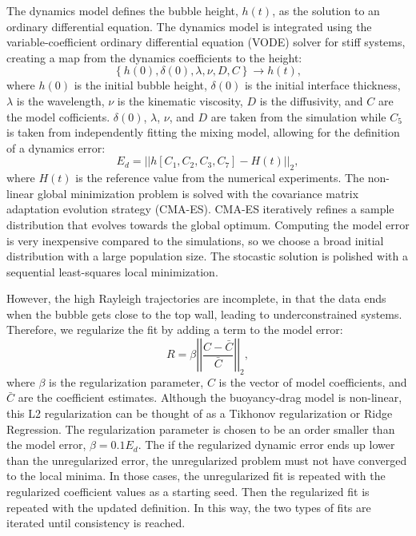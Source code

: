 The dynamics model defines the bubble height, $h(t)$, as the solution to an ordinary differential equation.
The dynamics model is integrated using the variable-coefficient ordinary differential equation (VODE) solver for stiff systems, creating a map from the dynamics coefficients to the height:
\begin{equation}
\left\{h(0), \delta(0), \lambda, \nu, D, C\right\} \rightarrow h(t),
\end{equation}
where $h(0)$ is the initial bubble height,
$\delta(0)$ is the initial interface thickness,
$\lambda$ is the wavelength,
$\nu$ is the kinematic viscosity,
$D$ is the diffusivity, and
$C$ are the model cofficients.
$\delta(0)$, $\lambda$, $\nu$, and $D$ are taken from the simulation while $C_5$ is taken from independently fitting the mixing model, allowing for the definition of a dynamics error:
\begin{equation}
E_d = \left| \left| h\left[C_1, C_2, C_3, C_7\right] - H(t)\right| \right|_2,
\end{equation}
where $H(t)$ is the reference value from the numerical experiments.
The non-linear global minimization problem is solved with the covariance matrix adaptation evolution strategy (CMA-ES).
CMA-ES iteratively refines a sample distribution that evolves towards the global optimum.
Computing the model error is very inexpensive compared to the simulations, so we choose a broad initial distribution with a large population size.
The stocastic solution is polished with a sequential least-squares local minimization.

However, the high Rayleigh trajectories are incomplete, in that the data ends when the bubble gets close to the top wall, leading to underconstrained systems.
Therefore, we regularize the fit by adding a term to the model error:
\begin{equation}
R = \beta \left| \left| \frac{C - \bar{C}}{\bar{C}} \right| \right|_2,
\end{equation}
where $\beta$ is the regularization parameter,
$C$ is the vector of model coefficients, and
$\bar{C}$ are the coefficient estimates.
Although the buoyancy-drag model is non-linear, this L2 regularization can be thought of as a Tikhonov regularization or Ridge Regression.
The regularization parameter is chosen to be an order smaller than the model error, $\beta = 0.1 E_d$.
The if the regularized dynamic error ends up lower than the unregularized error, the unregularized problem must not have converged to the local minima.
In those cases, the unregularized fit is repeated with the regularized coefficient values as a starting seed.
Then the regularized fit is repeated with the updated definition.
In this way, the two types of fits are iterated until consistency is reached.

